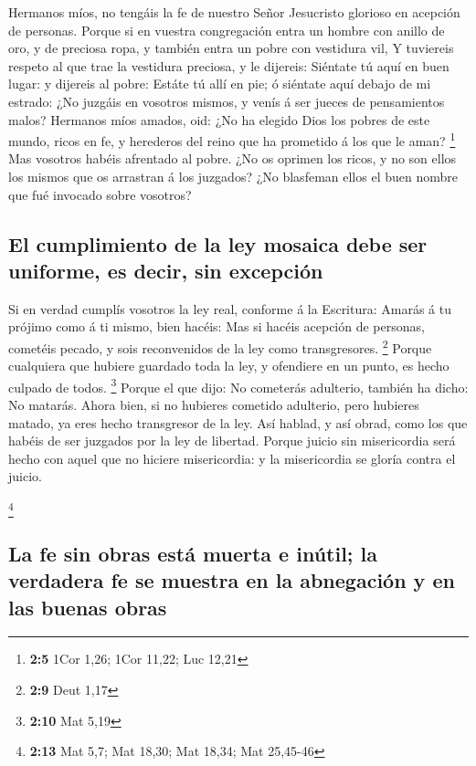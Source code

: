  Hermanos míos, no tengáis la fe de nuestro Señor
Jesucristo glorioso en acepción de personas.  Porque si en
vuestra congregación entra un hombre con anillo de oro, y de preciosa
ropa, y también entra un pobre con vestidura vil,  Y
tuviereis respeto al que trae la vestidura preciosa, y le dijereis:
Siéntate tú aquí en buen lugar: y dijereis al pobre: Estáte tú allí en
pie; ó siéntate aquí debajo de mi estrado:  ¿No juzgáis en
vosotros mismos, y venís á ser jueces de pensamientos malos?
 Hermanos míos amados, oid: ¿No ha elegido Dios los pobres
de este mundo, ricos en fe, y herederos del reino que ha prometido á los
que le aman? \footnote{\textbf{2:5} 1Cor 1,26; 1Cor 11,22; Luc 12,21}
 Mas vosotros habéis afrentado al pobre. ¿No os oprimen
los ricos, y no son ellos los mismos que os arrastran á los juzgados?
 ¿No blasfeman ellos el buen nombre que fué invocado sobre
vosotros?

\hypertarget{el-cumplimiento-de-la-ley-mosaica-debe-ser-uniforme-es-decir-sin-excepciuxf3n}{%
\subsection{El cumplimiento de la ley mosaica debe ser uniforme, es
decir, sin
excepción}\label{el-cumplimiento-de-la-ley-mosaica-debe-ser-uniforme-es-decir-sin-excepciuxf3n}}

 Si en verdad cumplís vosotros la ley real, conforme á la
Escritura: Amarás á tu prójimo como á ti mismo, bien hacéis:
 Mas si hacéis acepción de personas, cometéis pecado, y
sois reconvenidos de la ley como transgresores. \footnote{\textbf{2:9}
  Deut 1,17}  Porque cualquiera que hubiere guardado toda
la ley, y ofendiere en un punto, es hecho culpado de todos. \footnote{\textbf{2:10}
  Mat 5,19}  Porque el que dijo: No cometerás adulterio,
también ha dicho: No matarás. Ahora bien, si no hubieres cometido
adulterio, pero hubieres matado, ya eres hecho transgresor de la ley.
 Así hablad, y así obrad, como los que habéis de ser
juzgados por la ley de libertad.  Porque juicio sin
misericordia será hecho con aquel que no hiciere misericordia: y la
misericordia se gloría contra el juicio.

\footnote{\textbf{2:13} Mat 5,7; Mat 18,30; Mat 18,34; Mat 25,45-46}

\hypertarget{la-fe-sin-obras-estuxe1-muerta-e-inuxfatil-la-verdadera-fe-se-muestra-en-la-abnegaciuxf3n-y-en-las-buenas-obras}{%
\subsection{La fe sin obras está muerta e inútil; la verdadera fe se
muestra en la abnegación y en las buenas
obras}\label{la-fe-sin-obras-estuxe1-muerta-e-inuxfatil-la-verdadera-fe-se-muestra-en-la-abnegaciuxf3n-y-en-las-buenas-obras}}

